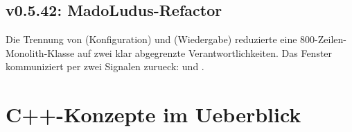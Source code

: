 \subsection{v0.5.42: MadoLudus-Refactor}

Die Trennung von 
(Konfiguration) und 
(Wiedergabe) reduzierte eine 800-Zeilen-Monolith-Klasse
auf zwei klar abgegrenzte Verantwortlichkeiten.
Das Fenster kommuniziert per zwei Signalen zurueck:
 und
.

\section{C++-Konzepte im Ueberblick}

